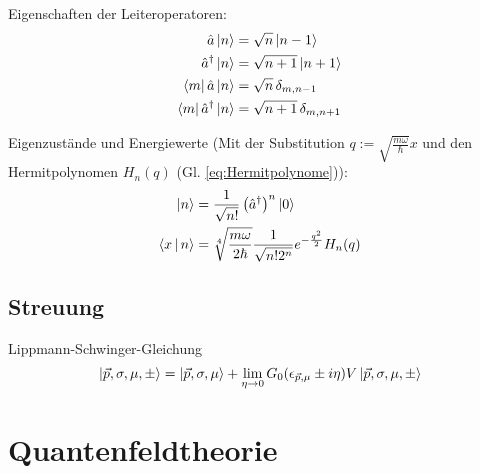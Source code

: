 \documentclass[11pt]{article}
\numberwithin{equation}{section}
\begin{document}
        Eigenschaften der Leiteroperatoren:
        \begin{equation}
          \begin{aligned}
            \hat{a}\Ket{n} &= \sqrt{n}\Ket{n-1} \\
            \hat{a}^\dagger\Ket{n} &= \sqrt{n+1}\Ket{n+1} \\
            \Bra{m}\hat{a}\Ket{n} &= \sqrt{n} \,\delta_{m,n-1} \\
            \Bra{m}\hat{a}^\dagger\Ket{n} &= \sqrt{n+1} \,\delta_{m,n+1} \\
          \end{aligned}
        \end{equation}

        Eigenzustände und Energiewerte (Mit der Substitution $q:=\sqrt{\frac{m\omega}{\hbar}}x$ und den Hermitpolynomen $H_n(q)$ (Gl. \ref{eq:Hermitpolynome})):
        \begin{equation}
          \begin{aligned}
            \Ket{n} &= \frac{1}{\sqrt{n!}}\left(\hat{a}^\dagger\right)^n\Ket{0} \\
            \Braket{x|n} &= \sqrt[4]{\frac{m\omega}{2\hbar}} \frac{1}{\sqrt{n! 2^n}} e^{-\frac{q^2}{2}} H_n(q) \\
          \end{aligned}
        \end{equation}

    \subsection{Streuung}
      Lippmann-Schwinger-Gleichung
      \begin{equation}
        \Ket{\vec{p},\sigma,\mu,\pm} = \Ket{\vec{p}, \sigma, \mu} + \lim_{\eta\rightarrow 0} G_0(\epsilon_{\vec{p},\mu}\pm i\eta) V \Ket{\vec{p},\sigma,\mu,\pm}
      \end{equation}


  \newpage
	\section{Quantenfeldtheorie}
\end{document}
